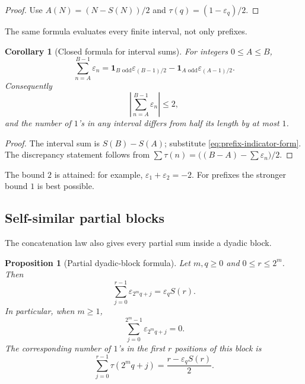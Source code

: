 \documentclass[11pt,oneside]{article}
\newtheorem{proposition}[theorem]{Proposition}
\newtheorem{corollary}[theorem]{Corollary}
\theoremstyle{definition}
\theoremstyle{remark}
\newcommand{\ind}{\mathbf 1}
\begin{document}
\begin{proof}
Use $A(N)=(N-S(N))/2$ and
$\tau(q)=(1-\varepsilon_q)/2$.
\end{proof}

The same formula evaluates every finite interval, not only prefixes.

\begin{corollary}[Closed formula for interval sums]
\label{cor:interval-sum}
For integers $0\le A\le B$,
\begin{equation}
 \boxed{\displaystyle
 \sum_{n=A}^{B-1}\varepsilon_n
 =\ind_{B\text{ odd}}\varepsilon_{(B-1)/2}
  -\ind_{A\text{ odd}}\varepsilon_{(A-1)/2}.}             \label{eq:interval-sum}
\end{equation}
Consequently
\begin{equation}
  \left|\sum_{n=A}^{B-1}\varepsilon_n\right|\le2,        \label{eq:interval-discrepancy-bound}
\end{equation}
and the number of $1$'s in any interval differs from half its length by at
most $1$.
\end{corollary}

\begin{proof}
The interval sum is $S(B)-S(A)$; substitute
\eqref{eq:prefix-indicator-form}.  The discrepancy statement follows from
$\sum\tau(n)=\bigl((B-A)-\sum\varepsilon_n\bigr)/2$.
\end{proof}

The bound $2$ is attained: for example,
$\varepsilon_1+\varepsilon_2=-2$.  For prefixes the stronger bound $1$ is
best possible.

\subsection{Self-similar partial blocks}

The concatenation law also gives every partial sum inside a dyadic block.

\begin{proposition}[Partial dyadic-block formula]
\label{prop:partial-dyadic-block}
Let $m,q\ge0$ and $0\le r\le2^m$.  Then
\begin{equation}
  \boxed{\displaystyle
  \sum_{j=0}^{r-1}\varepsilon_{2^m q+j}
  =\varepsilon_q S(r).}                                   \label{eq:partial-dyadic-block}
\end{equation}
In particular, when $m\ge1$,
\begin{equation}
  \sum_{j=0}^{2^m-1}\varepsilon_{2^m q+j}=0.              \label{eq:full-dyadic-block-zero}
\end{equation}
The corresponding number of $1$'s in the first $r$ positions of this block is
\begin{equation}
  \sum_{j=0}^{r-1}\tau(2^m q+j)
  =\frac{r-\varepsilon_qS(r)}2.                            \label{eq:partial-dyadic-one-count}
\end{equation}
\end{proposition}
\end{document}
